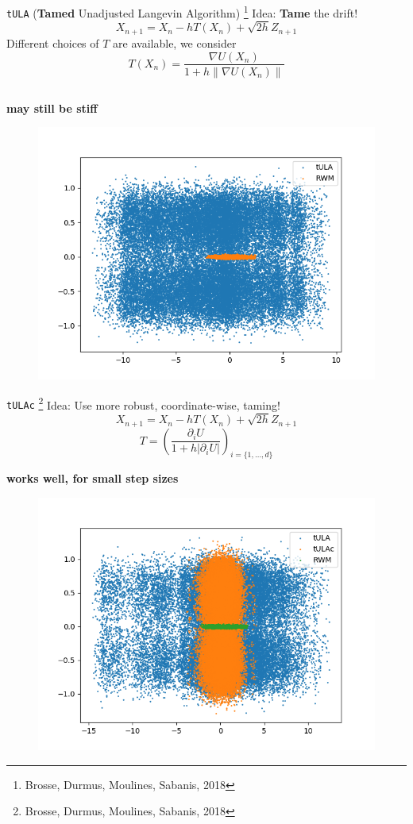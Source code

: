 \documentclass[aspectratio=169]{beamer}
\newcommand{\grad}{\nabla}
\begin{document}
\begin{frame}{\texttt{tULA} (\textbf{Tamed} Unadjusted Langevin Algorithm)    \footnote{Brosse, Durmus, Moulines, Sabanis, 2018}}
Idea: \textbf{Tame} the drift!
\[ X_{n+1} = X_n -hT(X_n) +\sqrt{2h}Z_{n+1} \]
Different choices of \(T\) are available, we consider 
\[T(X_n)=\frac{\grad U(X_n) }{1+h\|\grad U(X_n)\|}\]
    
   \[\]
   \[\]
   \centerline{\textbf{may still be stiff}}
  
\end{frame}

\begin{frame}
\begin{figure}
    \centering
    \includegraphics[width=0.8\linewidth]{Figures/transparentTULA.png}
\end{figure}
\end{frame}

\begin{frame}{\texttt{tULAc}     \footnote{Brosse, Durmus, Moulines, Sabanis, 2018}}
    Idea: Use more robust, coordinate-wise, taming!
        \[ X_{n+1} = X_n -hT(X_n) +\sqrt{2h}Z_{n+1} \] \[\]
        \[T=\left(\frac{\partial_i U}{1+h|\partial_i U|}\right)_{i=\lbrace 1, \dots, d\rbrace}\]
   \[\]
   \[\]
   \centerline{\textbf{works well, for small step sizes}}
\end{frame}

\begin{frame}
\begin{figure}
    \centering
    \includegraphics[width=0.8\linewidth]{Figures/transparentBoth.png}
\end{figure}
\end{frame}
\end{document}
